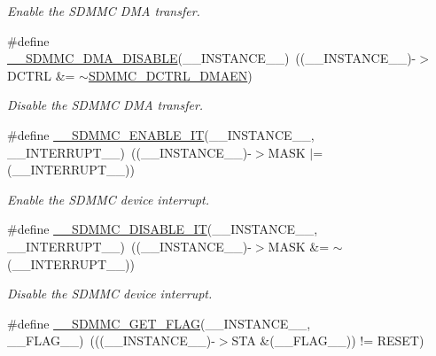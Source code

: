 \begin{DoxyCompactItemize}
\begin{DoxyCompactList}\small\item\em Enable the S\+D\+M\+MC D\+MA transfer. \end{DoxyCompactList}\item 
\#define \mbox{\hyperlink{group___s_d_m_m_c___l_l___interrupt___clock_ga4fca947c530ed9f953460eb48583fd9d}{\+\_\+\+\_\+\+S\+D\+M\+M\+C\+\_\+\+D\+M\+A\+\_\+\+D\+I\+S\+A\+B\+LE}}(\+\_\+\+\_\+\+I\+N\+S\+T\+A\+N\+C\+E\+\_\+\+\_\+)~((\+\_\+\+\_\+\+I\+N\+S\+T\+A\+N\+C\+E\+\_\+\+\_\+)-\/$>$D\+C\+T\+RL \&= $\sim$\mbox{\hyperlink{group___peripheral___registers___bits___definition_ga47f4fcb4a5ec9a4e8d077a5edc82ebf8}{S\+D\+M\+M\+C\+\_\+\+D\+C\+T\+R\+L\+\_\+\+D\+M\+A\+EN}})
\begin{DoxyCompactList}\small\item\em Disable the S\+D\+M\+MC D\+MA transfer. \end{DoxyCompactList}\item 
\#define \mbox{\hyperlink{group___s_d_m_m_c___l_l___interrupt___clock_ga086886ffa7d502709c637568ed6e0466}{\+\_\+\+\_\+\+S\+D\+M\+M\+C\+\_\+\+E\+N\+A\+B\+L\+E\+\_\+\+IT}}(\+\_\+\+\_\+\+I\+N\+S\+T\+A\+N\+C\+E\+\_\+\+\_\+,  \+\_\+\+\_\+\+I\+N\+T\+E\+R\+R\+U\+P\+T\+\_\+\+\_\+)~((\+\_\+\+\_\+\+I\+N\+S\+T\+A\+N\+C\+E\+\_\+\+\_\+)-\/$>$M\+A\+SK $\vert$= (\+\_\+\+\_\+\+I\+N\+T\+E\+R\+R\+U\+P\+T\+\_\+\+\_\+))
\begin{DoxyCompactList}\small\item\em Enable the S\+D\+M\+MC device interrupt. \end{DoxyCompactList}\item 
\#define \mbox{\hyperlink{group___s_d_m_m_c___l_l___interrupt___clock_gadc1f20eee0d4a76c9f416893569ad5d0}{\+\_\+\+\_\+\+S\+D\+M\+M\+C\+\_\+\+D\+I\+S\+A\+B\+L\+E\+\_\+\+IT}}(\+\_\+\+\_\+\+I\+N\+S\+T\+A\+N\+C\+E\+\_\+\+\_\+,  \+\_\+\+\_\+\+I\+N\+T\+E\+R\+R\+U\+P\+T\+\_\+\+\_\+)~((\+\_\+\+\_\+\+I\+N\+S\+T\+A\+N\+C\+E\+\_\+\+\_\+)-\/$>$M\+A\+SK \&= $\sim$(\+\_\+\+\_\+\+I\+N\+T\+E\+R\+R\+U\+P\+T\+\_\+\+\_\+))
\begin{DoxyCompactList}\small\item\em Disable the S\+D\+M\+MC device interrupt. \end{DoxyCompactList}\item 
\#define \mbox{\hyperlink{group___s_d_m_m_c___l_l___interrupt___clock_gaec3b40ed50180866f4b6329457157166}{\+\_\+\+\_\+\+S\+D\+M\+M\+C\+\_\+\+G\+E\+T\+\_\+\+F\+L\+AG}}(\+\_\+\+\_\+\+I\+N\+S\+T\+A\+N\+C\+E\+\_\+\+\_\+,  \+\_\+\+\_\+\+F\+L\+A\+G\+\_\+\+\_\+)~(((\+\_\+\+\_\+\+I\+N\+S\+T\+A\+N\+C\+E\+\_\+\+\_\+)-\/$>$S\+TA \&(\+\_\+\+\_\+\+F\+L\+A\+G\+\_\+\+\_\+)) != R\+E\+S\+ET)

\end{DoxyCompactItemize}
